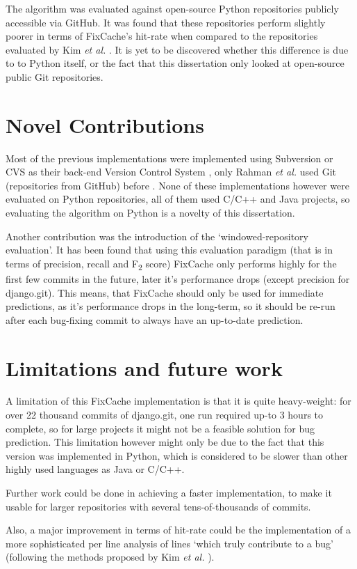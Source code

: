 \documentclass[12pt,twoside,notitlepage]{report}
\newcommand{\fxch}{FixCache}
\newcommand{\etal}{\textit{et al.}}
\begin{document}
The algorithm was evaluated against open-source Python repositories publicly accessible via GitHub. It was found that these repositories perform slightly poorer in terms of \fxch{'s} hit-rate when compared to the repositories evaluated by Kim \etal{} \cite{FixCache}. It is yet to be discovered whether this difference is due to to Python itself, or the fact that this dissertation only looked at open-source public Git repositories.

\clearpage
\section{Novel Contributions}
Most of the previous implementations were implemented using Subversion or CVS as their back-end Version Control System \cite{FixCache}\cite{Sadowski}, only Rahman \etal{} used Git (repositories from GitHub) before \cite{Bugcache}. None of these implementations however were evaluated on Python repositories, all of them used C/C++ and Java projects, so evaluating the algorithm on Python is a novelty of this dissertation.

Another contribution was the introduction of the `windowed-repository evaluation'. It has been found that using this evaluation paradigm (that is in terms of precision, recall and F\textsubscript{2} score) \fxch{} only performs highly for the first few commits in the future, later it's performance drops (except precision for django.git). This means, that \fxch{} should only be used for immediate predictions, as it's performance drops in the long-term, so it should be re-run after each bug-fixing commit to always have an up-to-date prediction.
\section{Limitations and future work}
A limitation of this \fxch{} implementation is that it is quite heavy-weight: for over 22 thousand commits of django.git, one run required up-to 3 hours to complete, so for large projects it might not be a feasible solution for bug prediction. This limitation however might only be due to the fact that this version was implemented in Python, which is considered to be slower than other highly used languages as Java or C/C++.

Further work could be done in achieving a faster implementation, to make it usable for larger repositories with several tens-of-thousands of commits.

Also, a major improvement in terms of hit-rate could be the implementation of a more sophisticated per line analysis of lines `which truly contribute to a bug' (following the methods proposed by Kim \etal{} \cite{KimZim}).
\end{document}
